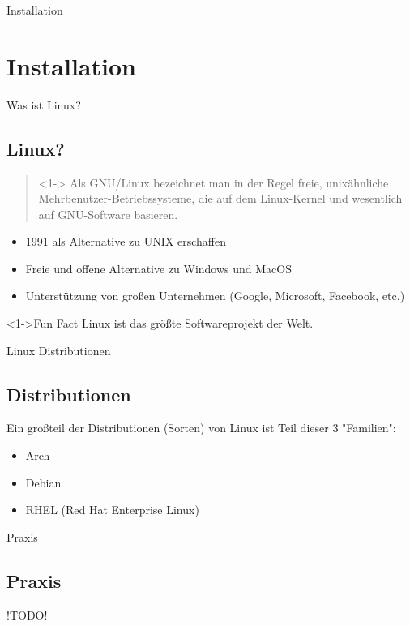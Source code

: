 
\begin{frame}{Installation}
    \section{Installation}\label{sec:installation}
\end{frame}

\begin{frame}{Was ist Linux?}
    \subsection{Linux?}\label{subsec:linux?}

    \begin{quote}<1->
        Als GNU/Linux bezeichnet man in der Regel freie, unixähnliche Mehrbenutzer-Betriebssysteme, die auf dem Linux-Kernel und wesentlich auf GNU-Software basieren.
    \end{quote}

    \begin{itemize}
        \item<2-> 1991 als Alternative zu UNIX erschaffen
        \item<3-> Freie und offene Alternative zu Windows und MacOS
        \item<4-> Unterstützung von großen Unternehmen (Google, Microsoft, Facebook, etc.)
    \end{itemize}
    \begin{alertblock}<1->{Fun Fact}
        Linux ist das größte Softwareprojekt der Welt.
    \end{alertblock}

\end{frame}

\begin{frame}{Linux Distributionen}
    \subsection{Distributionen}\label{subsec:distributionen}

    Ein großteil der Distributionen (Sorten) von Linux ist Teil dieser 3 "Familien":

    \pause

    \begin{itemize}
        \item Arch
        \item Debian
        \item RHEL (Red Hat Enterprise Linux)
    \end{itemize}

\end{frame}

\begin{frame}{Praxis}
    \subsection{Praxis}\label{subsec:praxis}

    !TODO!

\end{frame}
